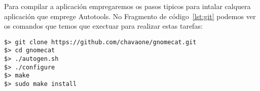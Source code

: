 Para compilar a aplicación empregaremos os pasos tipicos para intalar calquera aplicación que emprege Autotools. No Fragmento de código~\ref{lst:git} podemos ver os comandos que temos que exectuar para realizar estas tarefas:

\begin{lstlisting}[label=lst:git,caption=Comando para instalar utilidades e dependencias]
$> git clone https://github.com/chavaone/gnomecat.git
$> cd gnomecat
$> ./autogen.sh
$> ./configure
$> make
$> sudo make install
\end{lstlisting}

